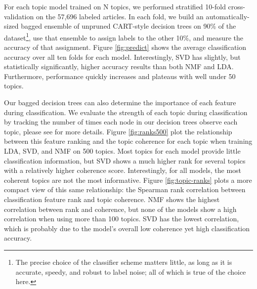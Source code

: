 For each topic model trained on N topics, we performed stratified 10-fold
cross-validation on the 57,696 labeled articles. In each fold,
we build an automatically-sized bagged ensemble of unpruned CART-style decision
trees\cite{banfield07compareensemble} on 90\% of the
dataset\footnote{The precise choice of the classifier scheme matters
little, as long as it is accurate, speedy, and robust to label noise;
all of which is true of the choice here.}, use that ensemble
to assign labels to the other 10\%, and measure the accuracy of that assignment.
Figure \ref{fig:predict} shows the average classification accuracy over all ten
folds for each model.  Interestingly, SVD has slightly, but statistically
significantly, higher accuracy results than both NMF and LDA.  Furthermore,
performance quickly increases and plateaus with well under 50 topics.

Our bagged decision trees can also determine the importance of each feature
during classification.  We evaluate the strength of each topic during
classification by tracking the number of times each node in our decision trees
observe each topic, please see \cite{Caruana06miningcitizen} for more details.
Figure \ref{fig:ranks500} plot the relationship between this feature ranking and
the topic coherence for each topic when training LDA, SVD, and NMF on 500
topics.  Most topics for each model provide little classification information,
but SVD shows a much higher rank for several topics with a relatively higher
coherence score.  Interestingly, for all models, the most coherent topics are
not the most informative.  Figure \ref{fig:topic-ranks} plots a more compact
view of this same relationship: the Spearman rank correlation between
classification feature rank and topic coherence.  NMF shows the highest
correlation between rank and coherence, but none of the models show a high
correlation when using more than 100 topics.  SVD has the lowest
correlation, which is probably due to the model's overall low coherence yet high
classification accuracy.  

